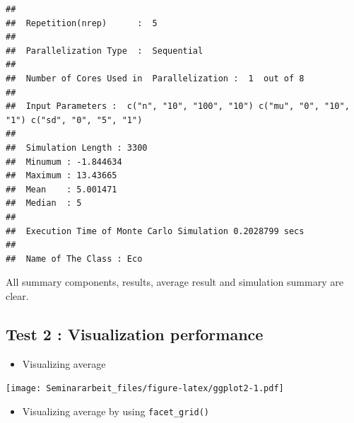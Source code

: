\documentclass[11pt,a4paper]{article}
\newenvironment{Shaded}{\begin{snugshade}}{\end{snugshade}}
\newcommand{\AttributeTok}[1]{\textcolor[rgb]{0.77,0.63,0.00}{#1}}
\newcommand{\FunctionTok}[1]{\textcolor[rgb]{0.00,0.00,0.00}{#1}}
\newcommand{\NormalTok}[1]{#1}
\newcommand{\SpecialCharTok}[1]{\textcolor[rgb]{0.00,0.00,0.00}{#1}}
\begin{document}
\begin{verbatim}
## 
##  Repetition(nrep)      :  5 
## 
##  Parallelization Type  :  Sequential 
## 
##  Number of Cores Used in  Parallelization :  1  out of 8 
## 
##  Input Parameters :  c("n", "10", "100", "10") c("mu", "0", "10", "1") c("sd", "0", "5", "1") 
## 
##  Simulation Length : 3300 
##  Minumum : -1.844634 
##  Maximum : 13.43665 
##  Mean    : 5.001471 
##  Median  : 5 
## 
##  Execution Time of Monte Carlo Simulation 0.2028799 secs 
## 
##  Name of The Class : Eco
\end{verbatim}

All summary components, results, average result and simulation summary
are clear.

\hypertarget{test-2-visualization-performance}{%
\subsection{Test 2 : Visualization
performance}\label{test-2-visualization-performance}}

\begin{itemize}

\item
  Visualizing average
\end{itemize}

\begin{Shaded}
\end{Shaded}

\texttt{[image: Seminararbeit\_files/figure-latex/ggplot2-1.pdf]}

\begin{itemize}

\item
  Visualizing average by using \texttt{facet\_grid()}
\end{itemize}

\begin{Shaded}
\end{Shaded}
\end{document}
